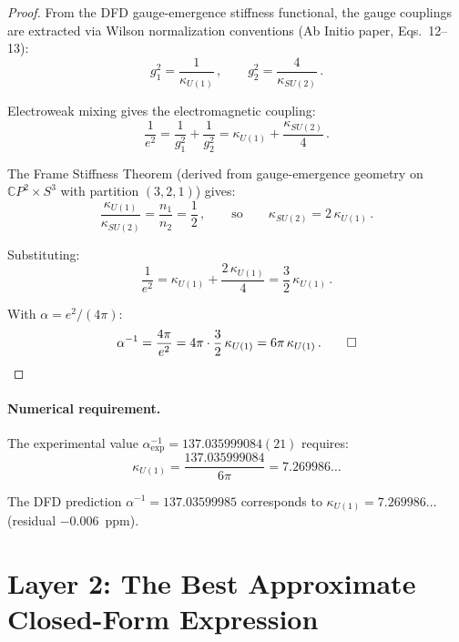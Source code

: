 \documentclass[12pt,a4paper]{article}
\theoremstyle{definition}
\begin{document}
\begin{proof}
From the DFD gauge-emergence stiffness functional, the gauge couplings
are extracted via Wilson normalization conventions (Ab Initio paper, Eqs.~12--13):
\begin{equation}
g_1^2 = \frac{1}{\kappa_{U(1)}}\,,\qquad
g_2^2 = \frac{4}{\kappa_{SU(2)}}\,.
\end{equation}

Electroweak mixing gives the electromagnetic coupling:
\begin{equation}
\frac{1}{e^2} = \frac{1}{g_1^2} + \frac{1}{g_2^2}
= \kappa_{U(1)} + \frac{\kappa_{SU(2)}}{4}\,.
\end{equation}

The Frame Stiffness Theorem (derived from gauge-emergence geometry on
$\mathbb{C}P^2 \times S^3$ with partition $(3,2,1)$) gives:
\begin{equation}
\frac{\kappa_{U(1)}}{\kappa_{SU(2)}} = \frac{n_1}{n_2} = \frac{1}{2}\,,
\qquad\text{so}\qquad \kappa_{SU(2)} = 2\,\kappa_{U(1)}\,.
\end{equation}

Substituting:
\begin{equation}
\frac{1}{e^2} = \kappa_{U(1)} + \frac{2\,\kappa_{U(1)}}{4}
= \frac{3}{2}\,\kappa_{U(1)}\,.
\end{equation}

With $\alpha = e^2/(4\pi)$:
\begin{equation}
\alpha^{-1} = \frac{4\pi}{e^2} = 4\pi \cdot \frac{3}{2}\,\kappa_{U(1)}
= 6\pi\,\kappa_{U(1)}\,. \qed
\end{equation}
\end{proof}

\paragraph{Numerical requirement.}
The experimental value $\alpha^{-1}_{\mathrm{exp}} = 137.035999084(21)$ requires:
\begin{equation}
\kappa_{U(1)} = \frac{137.035999084}{6\pi} = 7.269986\ldots
\end{equation}

The DFD prediction $\alpha^{-1} = 137.03599985$ corresponds to
$\kappa_{U(1)} = 7.269986\ldots$ (residual $-0.006$~ppm).

\section{Layer 2: The Best Approximate Closed-Form Expression}
\label{sec:layer2}
\end{document}
